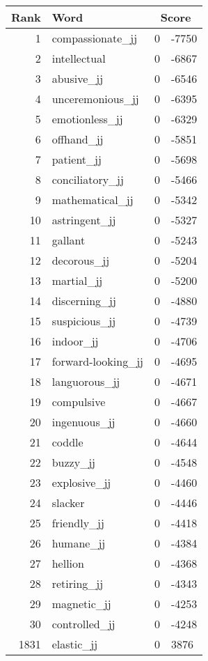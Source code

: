 \begin{longtable}[!htbp]{| rlr@{.}l |}
    \hline
    \textbf{Rank} & \textbf{Word} & \multicolumn{2}{c|}{\textbf{Score}} \\
    \hline
    \endhead
    1 & compassionate\_jj & 0 & -7750 \\
    2 & intellectual & 0 & -6867 \\
    3 & abusive\_jj & 0 & -6546 \\
    4 & unceremonious\_jj & 0 & -6395 \\
    5 & emotionless\_jj & 0 & -6329 \\
    6 & offhand\_jj & 0 & -5851 \\
    7 & patient\_jj & 0 & -5698 \\
    8 & conciliatory\_jj & 0 & -5466 \\
    9 & mathematical\_jj & 0 & -5342 \\
    10 & astringent\_jj & 0 & -5327 \\
    11 & gallant & 0 & -5243 \\
    12 & decorous\_jj & 0 & -5204 \\
    13 & martial\_jj & 0 & -5200 \\
    14 & discerning\_jj & 0 & -4880 \\
    15 & suspicious\_jj & 0 & -4739 \\
    16 & indoor\_jj & 0 & -4706 \\
    17 & forward-looking\_jj & 0 & -4695 \\
    18 & languorous\_jj & 0 & -4671 \\
    19 & compulsive & 0 & -4667 \\
    20 & ingenuous\_jj & 0 & -4660 \\
    21 & coddle & 0 & -4644 \\
    22 & buzzy\_jj & 0 & -4548 \\
    23 & explosive\_jj & 0 & -4460 \\
    24 & slacker & 0 & -4446 \\
    25 & friendly\_jj & 0 & -4418 \\
    26 & humane\_jj & 0 & -4384 \\
    27 & hellion & 0 & -4368 \\
    28 & retiring\_jj & 0 & -4343 \\
    29 & magnetic\_jj & 0 & -4253 \\
    30 & controlled\_jj & 0 & -4248 \\
    1831 & elastic\_jj & 0 & 3876 \\

\end{longtable}
